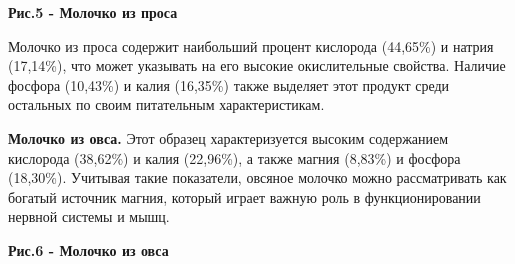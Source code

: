 

{\bfseries Рис.5 - Молочко из проса}

Молочко из проса содержит наибольший процент кислорода (44,65\%) и
натрия (17,14\%), что может указывать на его высокие окислительные
свойства. Наличие фосфора (10,43\%) и калия (16,35\%) также выделяет
этот продукт среди остальных по своим питательным характеристикам.

{\bfseries Молочко из овса.} Этот образец характеризуется высоким
содержанием кислорода (38,62\%) и калия (22,96\%), а также магния
(8,83\%) и фосфора (18,30\%). Учитывая такие показатели, овсяное молочко
можно рассматривать как богатый источник магния, который играет важную
роль в функционировании нервной системы и мышц.




{\bfseries Рис.6 - Молочко из овса}

